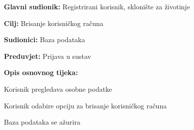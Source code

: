 					\noindent {}
					\begin{packed_item}
	
						\item \textbf{Glavni sudionik:} Registrirani korisnik, sklonište za životinje
						\item  \textbf{Cilj:} Brisanje korisničkog računa
						\item  \textbf{Sudionici:} Baza podataka
						\item  \textbf{Preduvjet:} Prijava u sustav
						\item  \textbf{Opis osnovnog tijeka:}
						
						\item[] \begin{packed_enum}
	
							\item Korisnik pregledava osobne podatke
							\item Korisnik odabire opciju za brisanje korisničkog računa
							\item Baza podataka se ažurira
						\end{packed_enum}
					\end{packed_item}
					\pagebreak
					
